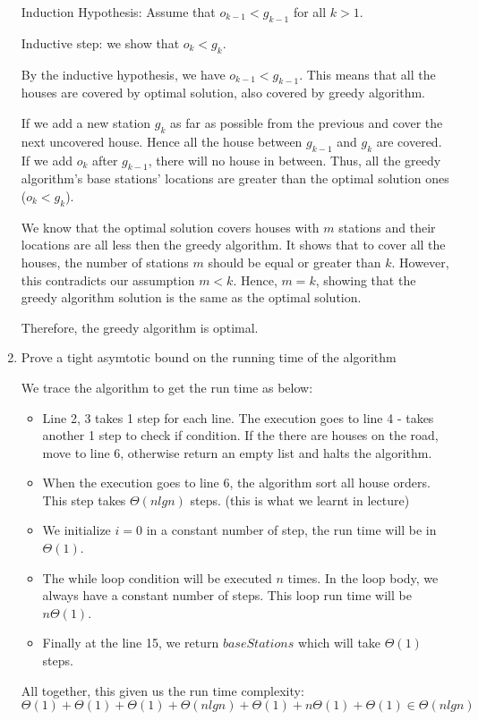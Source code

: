\documentclass{cpsc413Solutions}
\begin{document}
\begin{problemlist}
\begin{problem}
\begin{answer}
\begin{enumerate}
    Induction Hypothesis: Assume that $o_{k-1} < g_{k-1}$ for all $k>1$.
    
    Inductive step: we show that $o_{k} < g_{k}$.
    
    By the inductive hypothesis, we have $o_{k-1} < g_{k-1}$. This means that all the houses are covered by optimal solution, also covered by greedy algorithm.
    
    If we add a new station $g_k$ as far as possible from the previous and cover the next uncovered house. Hence all the house between $g_{k-1}$ and $g_{k}$ are covered. If we add $o_{k}$ after $g_{k-1}$, there will no house in between. Thus, all the greedy algorithm's base stations' locations are greater than the optimal solution ones ($o_{k} < g_{k}$).
    
    We know that the optimal solution covers houses with $m$ stations and their locations are all less then the greedy algorithm. It shows that to cover all the houses, the number of stations $m$ should be equal or greater than $k$. However, this contradicts our assumption $m<k$. Hence, $m=k$, showing that the greedy algorithm solution is the same as the optimal solution.
    
    Therefore, the greedy algorithm is optimal.
    
    
    \item Prove a tight asymtotic bound on the running time of the algorithm
    
    We trace the algorithm to get the run time as below:
    \begin{itemize}
        \item Line 2, 3 takes 1 step for each line. The execution goes to line 4 - takes another 1 step to check if condition. If the there are houses on the road, move to line 6, otherwise return an empty list and halts the algorithm.
        \item When the execution goes to line 6, the algorithm sort all house orders. This step takes $\Theta(nlgn)$ steps. (this is what we learnt in lecture)
        \item We initialize $i = 0$ in a constant number of step, the run time will be in $\Theta(1)$.
        \item The while loop condition will be executed $n$ times. In the loop body, we always have a constant number of steps. This loop run time will be $n\Theta(1)$.
        \item Finally at the line 15, we return $baseStations$ which will take $\Theta(1)$ steps.
    \end{itemize}
     All together, this given us the run time complexity:
    $$\Theta(1)+\Theta(1)+\Theta(1)+\Theta(nlgn)+\Theta(1)+n\Theta(1) + \Theta(1) \in \Theta(nlgn)$$
    

\end{enumerate}
\end{answer}
\end{problem}
\end{problemlist}
\end{document}
